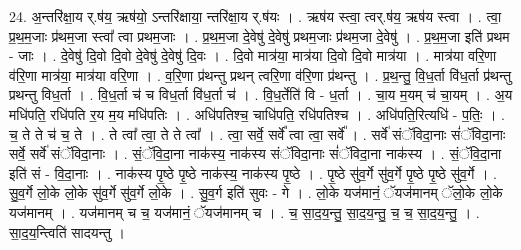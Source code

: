 \documentclass[17pt]{extarticle}
\begin{document}
24. अ॒न्तरि॑क्षा॒य र्.ष॑य॒ ऋष॑यो॒ ऽन्तरि॑क्षाया॒ न्तरि॑क्षा॒य र्.ष॑यः । . ऋष॑य स्त्वा॒ त्वर्.ष॑य॒ ऋष॑य स्त्वा । . त्वा॒ प्र॒थ॒म॒जाः प्र॑थम॒जा स्त्वा᳚ त्वा प्रथम॒जाः । . प्र॒थ॒म॒जा दे॒वेषु॑ दे॒वेषु॑ प्रथम॒जाः प्र॑थम॒जा दे॒वेषु॑ । . प्र॒थ॒म॒जा इति॑ प्रथम - जाः । . दे॒वेषु॑ दि॒वो दि॒वो दे॒वेषु॑ दे॒वेषु॑ दि॒वः । . दि॒वो मात्र॑या॒ मात्र॑या दि॒वो दि॒वो मात्र॑या । . मात्र॑या वरि॒णा व॑रि॒णा मात्र॑या॒ मात्र॑या वरि॒णा । . व॒रि॒णा प्र॑थन्तु प्रथन् त्वरि॒णा व॑रि॒णा प्र॑थन्तु । . प्र॒थ॒न्तु॒ वि॒ध॒र्ता वि॑ध॒र्ता प्र॑थन्तु प्रथन्तु विध॒र्ता । . वि॒ध॒र्ता च॑ च विध॒र्ता वि॑ध॒र्ता च॑ । . वि॒ध॒र्तेति॑ वि - ध॒र्ता । . चा॒य म॒यम् च॑ चा॒यम् । . अ॒य मधि॑पति॒ रधि॑पति र॒य म॒य मधि॑पतिः । . अधि॑पतिश्च॒ चाधि॑पति॒ रधि॑पतिश्च । . अधि॑पति॒रित्यधि॑ - प॒तिः॒ । . च॒ ते ते च॑ च॒ ते । . ते त्वा᳚ त्वा॒ ते ते त्वा᳚ । . त्वा॒ सर्वे॒ सर्वे᳚ त्वा त्वा॒ सर्वे᳚ । . सर्वे॑ संॅविदा॒नाः सं॑ॅविदा॒नाः सर्वे॒ सर्वे॑ संॅविदा॒नाः । . सं॒ॅवि॒दा॒ना नाक॑स्य॒ नाक॑स्य संॅविदा॒नाः सं॑ॅविदा॒ना नाक॑स्य । . सं॒ॅवि॒दा॒ना इति॑ सं - वि॒दा॒नाः । . नाक॑स्य पृ॒ष्ठे पृ॒ष्ठे नाक॑स्य॒ नाक॑स्य पृ॒ष्ठे । . पृ॒ष्ठे सु॑व॒र्गे सु॑व॒र्गे पृ॒ष्ठे पृ॒ष्ठे सु॑व॒र्गे । . सु॒व॒र्गे लो॒के लो॒के सु॑व॒र्गे सु॑व॒र्गे लो॒के । . सु॒व॒र्ग इति॑ सुवः - गे । . लो॒के यज॑मानं॒ ॅयज॑मानम् ॅलो॒के लो॒के यज॑मानम् । . यज॑मानम् च च॒ यज॑मानं॒ ॅयज॑मानम् च । . च॒ सा॒द॒य॒न्तु॒ सा॒द॒य॒न्तु॒ च॒ च॒ सा॒द॒य॒न्तु॒ । . सा॒द॒य॒न्त्विति॑ सादयन्तु । \newline
\end{document}
